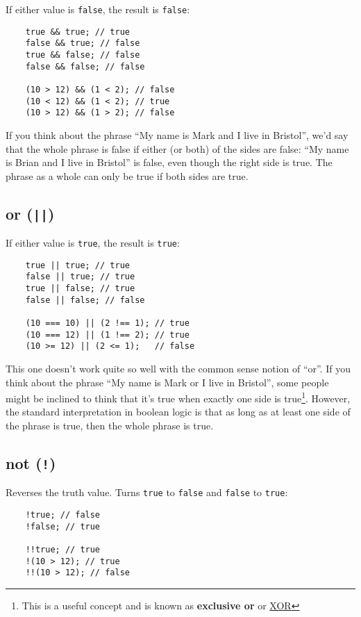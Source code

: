 If either value is \texttt{false}, the result is \texttt{false}:

\begin{verbatim}
    true && true; // true
    false && true; // false
    true && false; // false
    false && false; // false

    (10 > 12) && (1 < 2); // false
    (10 < 12) && (1 < 2); // true
    (10 > 12) && (1 > 2); // false
\end{verbatim}

If you think about the phrase ``My name is Mark and I live in Bristol'', we'd say that the whole phrase is false if either (or both) of the sides are false: ``My name is Brian and I live in Bristol'' is false, even though the right side is true. The phrase as a whole can only be true if both sides are true.


\subsection{or (\texttt{||})}

If either value is \texttt{true}, the result is \texttt{true}:

\begin{verbatim}
    true || true; // true
    false || true; // true
    true || false; // true
    false || false; // false

    (10 === 10) || (2 !== 1); // true
    (10 === 12) || (1 !== 2); // true
    (10 >= 12) || (2 <= 1);   // false
\end{verbatim}

This one doesn't work quite so well with the common sense notion of ``or''. If you think about the phrase ``My name is Mark or I live in Bristol'', some people might be inclined to think that it's true when exactly one side is true\footnote{This is a useful concept and is known as \textbf{exclusive or} or \href{https://en.wikipedia.org/wiki/Exclusive_or}{XOR}}. However, the standard interpretation in boolean logic is that as long as at least one side of the phrase is true, then the whole phrase is true.

\subsection{not (\texttt{!})}

Reverses the truth value. Turns \texttt{true} to \texttt{false} and \texttt{false} to \texttt{true}:

\begin{verbatim}
    !true; // false
    !false; // true

    !!true; // true
    !(10 > 12); // true
    !!(10 > 12); // false
\end{verbatim}

